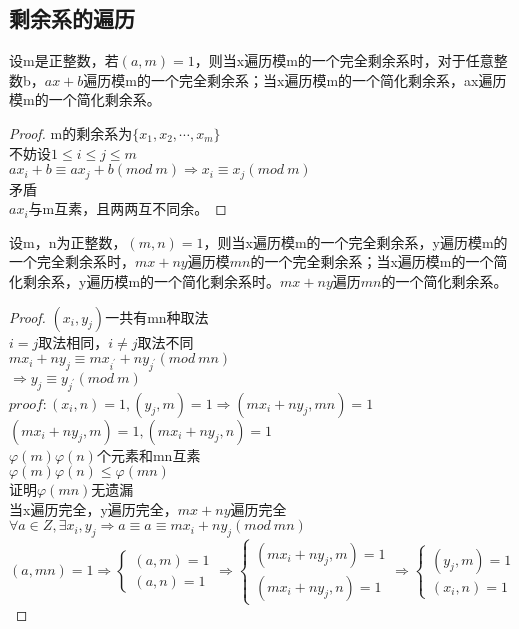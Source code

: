 \documentclass[cn,10pt]{elegantbook}
\begin{document}
\subsection{剩余系的遍历}
\begin{theorem}
  设m是正整数，若$(a,m) =1 $，则当x遍历模m的一个完全剩余系时，对于任意整数b，$ax+b$遍历模m的一个完全剩余系；当x遍历模m的一个简化剩余系，ax遍历模m的一个简化剩余系。
\end{theorem}
\begin{proof}
  m的剩余系为$\{ x_1,x_2,\cdots ,x_m\}$\\
  不妨设$1 \leq i \leq j \leq m$\\
  $ax_i+b \equiv ax_j+b(mod \ m) \Rightarrow x_i \equiv x_j(mod \ m)$\\
  矛盾\\
  $ax_i$与m互素，且两两互不同余。
\end{proof}
\begin{theorem}
  设m，n为正整数，$(m,n) =1$，则当x遍历模m的一个完全剩余系，y遍历模m的一个完全剩余系时，$mx+ny$遍历模$mn$的一个完全剩余系；当x遍历模m的一个简化剩余系，y遍历模m的一个简化剩余系时。$mx+ny$遍历$mn$的一个简化剩余系。
\end{theorem}
\begin{proof}
  $(x_i,y_j)$一共有mn种取法\\
  $i = j$取法相同，$i \neq j$取法不同\\
  $mx_i+ny_j \equiv mx_{i^{\prime}}+ny_{j^{\prime}}(mod \ mn)$\\
  $\Rightarrow y_j \equiv y_{j^{\prime}}(mod \ m)$\\
  $proof: (x_i,n)=1,(y_j,m)=1 \Rightarrow (mx_i+ny_j,mn) =1$\\
  $(mx_i+ny_j,m) = 1,(mx_i+ny_j,n) =1 $\\
  $\varphi(m) \varphi(n)$个元素和mn互素\\
  $\varphi(m) \varphi(n) \leq \varphi(mn)$\\
  证明$\varphi(mn)$无遗漏\\
  当x遍历完全，y遍历完全，$mx+ny$遍历完全\\
  $\forall a \in Z, \exists x_i,y_j \Rightarrow a \equiv a \equiv mx_i+ny_j(mod \ mn)$\\
  \[
    (a,mn) = 1 \Rightarrow
    \begin{cases}
      (a,m) =1\\
      (a,n) =1
    \end{cases}
    \Rightarrow
    \begin{cases}
      (mx_i+ny_j,m)=1\\
      (mx_i+ny_j,n)=1
    \end{cases}
    \Rightarrow
    \begin{cases}
      (y_j,m)=1\\
      (x_i,n)=1
    \end{cases}
  \]
\end{proof}
\end{document}
